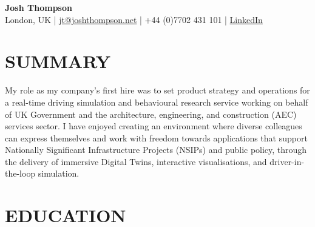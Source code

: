 \documentclass[a4paper,9pt]{extarticle}
\begin{document}
\begin{center}
    \textbf{\Large Josh Thompson} \\[3pt]
    London, UK | \href{mailto:jt@joshthompson.net}{jt@joshthompson.net} | +44 (0)7702 431 101 | \href{https://www.linkedin.com/in/josh-thompson-516328170/}{LinkedIn}
\end{center}

\section*{SUMMARY}
    My role as my company's first hire was to set product strategy and operations
    for a real-time driving simulation and behavioural research service working on behalf of UK Government and the architecture, engineering, and construction (AEC) services sector.
    I have enjoyed creating an environment where diverse colleagues can express themselves and work with freedom
    towards applications that support Nationally Significant Infrastructure Projects (NSIPs) and public policy,
    through the delivery of immersive Digital Twins, interactive visualisations, and driver-in-the-loop simulation.
    \vspace{1em}

 
\section*{EDUCATION}

\end{document}
